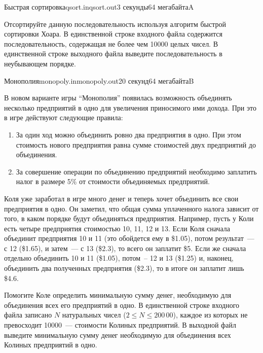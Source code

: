 \documentclass[12pt,a4paper,oneside,twocolumn,landscape]{article}
\begin{document}
\raggedbottom

\begin{problem}{Быстрая сортировка}{qsort.in}{qsort.out}{3 секунды}{64 мегабайта}{A}
\graphicspath{{.././qsort/statements/}}
Отсортируйте данную последовательность используя алгоритм быстрой сортировки Хоара.
\InputFile
В единственной строке входного файла содержится последовательность, содержащая не более чем 10000 целых чисел.
\OutputFile
В единственной строке выходного файла выведите последовательность в неубывающем порядке. 


\Example

\begin{example}
%
\end{example}


\end{problem}

\bigskip\bigskip
\begin{problem}{Монополия}{monopoly.in}{monopoly.out}{20 секунд}{64 мегабайта}{B}
\graphicspath{{.././monopoly/statements/}}
В новом варианте игры ``Монополия'' появилась возможность
объединять несколько предприятий в одно для увеличения 
приносимого ими дохода. При это в игре действуют следующие правила:

\begin{enumerate}
\item За один ход можно объединить ровно два предприятия в одно.
При этом стоимость нового предприятия равна сумме стоимостей
двух предприятий до объединения.
\item За совершение операции по объединению предприятий необходимо
заплатить налог в размере 5\% от стоимости объединяемых предприятий.
\end{enumerate}

Коля уже заработал в игре много денег и теперь хочет объединить все свои
предприятия в одно. Он заметил, что общая сумма уплаченного налога
зависит от того, в каком порядке будут объединяться предприятия.
Например, пусть у Коли есть четыре предприятия стоимостью 10, 11, 12 и 13.
Если Коля сначала объединит предприятия 10 и 11
(это обойдется ему в \$1.05), потом результат~--- с 12 (\$1.65), и затем~---
с 13 (\$2.3), то всего он заплатит \$5.
Если же сначала отдельно объединить 10 и 11 (\$1.05), потом~-- 12 и 13
(\$1.25) и, наконец, объединить два полученных предприятия
(\$2.3), то в итоге он заплатит лишь \$4.6.

Помогите Коле определить минимальную сумму денег, необходимую
для объединения всех его предприятий в одно.
\InputFile
В единственной строке входного файла записано
$N$ натуральных чисел ($2 \leq N \leq 200\,00$),
каждое из которых не превосходит 10000~---
стоимости Колиных предприятий.
\OutputFile
В выходной файл выведите минимальную сумму денег
необходимую для объединения всех Колиных предприятий в одно.

\Examples

\begin{example}
%
%
\end{example}


\end{problem}
\end{document}
